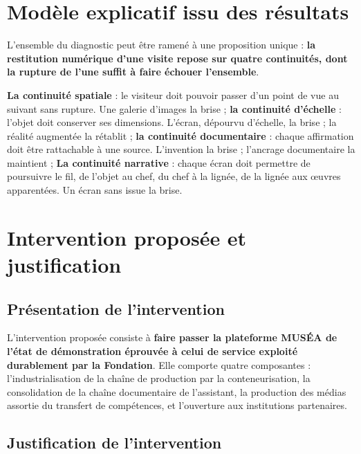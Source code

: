 \section{Modèle explicatif issu des résultats}
\label{sec:modele}

L'ensemble du diagnostic peut être ramené à une proposition unique :
\textbf{la restitution numérique d'une visite repose sur quatre continuités,
dont la rupture de l'une suffit à faire échouer l'ensemble}.

\textbf{La continuité spatiale} : le visiteur doit pouvoir passer d'un point
de vue au suivant sans rupture. Une galerie d'images la brise ; \textbf{la
continuité d'échelle} : l'objet doit conserver ses dimensions. L'écran,
dépourvu d'échelle, la brise ; la réalité augmentée la rétablit ; \textbf{la
continuité documentaire} : chaque affirmation doit être rattachable à une
source. L'invention la brise ; l'ancrage documentaire la maintient ;
\textbf{La continuité narrative} : chaque écran doit permettre de poursuivre
le fil, de l'objet au chef, du chef à la lignée, de la lignée aux œuvres
apparentées. Un écran sans issue la brise.

\section{Intervention proposée et justification}
\label{sec:intervention}

\subsection{Présentation de l'intervention}

L'intervention proposée consiste à \textbf{faire passer la plateforme MUSÉA de
l'état de démonstration éprouvée à celui de service exploité durablement par la
Fondation}. Elle comporte quatre composantes : l'industrialisation de la chaîne de
production par la conteneurisation, la consolidation de la chaîne documentaire
de l'assistant, la production des médias assortie du transfert de compétences,
et l'ouverture aux institutions partenaires.

\subsection{Justification de l'intervention}

